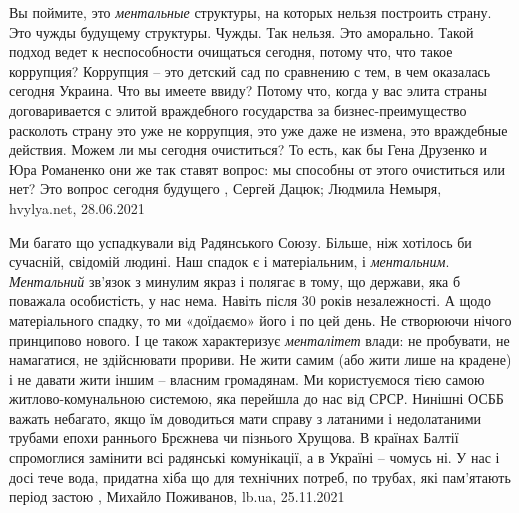Вы поймите, это \emph{ментальные} структуры, на которых нельзя построить страну. Это
чужды будущему структуры. Чужды. Так нельзя. Это аморально. Такой подход ведет
к неспособности очищаться сегодня, потому что, что такое коррупция? Коррупция –
это детский сад по сравнению с тем, в чем оказалась сегодня Украина.  Что вы
имеете ввиду?  Потому что, когда у вас элита страны договаривается с элитой
враждебного государства за бизнес-преимущество расколоть страну это уже не
коррупция, это уже даже не измена, это враждебные действия. Можем ли мы сегодня
очиститься? То есть, как бы Гена Друзенко и Юра Романенко они же так ставят
вопрос: мы способны от этого очиститься или нет? Это вопрос сегодня будущего
, 
Сергей Дацюк; Людмила Немыря, hvylya.net, 28.06.2021

Ми багато що успадкували від Радянського Союзу. Більше, ніж хотілось би
сучасній, свідомій людині. Наш спадок є і матеріальним, і \emph{ментальним}.
\emph{Ментальний} зв'язок з минулим якраз і полягає в тому, що держави, яка б поважала
особистість, у нас нема. Навіть після 30 років незалежності.  А щодо
матеріального спадку, то ми «доїдаємо» його і по цей день. Не створюючи нічого
принципово нового. І це також характеризує \emph{менталітет} влади: не пробувати, не
намагатися, не здійснювати прориви. Не жити самим (або жити лише на крадене) і
не давати жити іншим – власним громадянам.  Ми користуємося тією самою
житлово-комунальною системою, яка перейшла до нас від СРСР. Нинішні ОСББ важать
небагато, якщо їм доводиться мати справу з латаними і недолатаними трубами
епохи раннього Брєжнева чи пізнього Хрущова. В країнах Балтії спромоглися
замінити всі радянські комунікації, а в Україні – чомусь ні. У нас і досі тече
вода, придатна хіба що для технічних потреб, по трубах, які пам’ятають період
застою
, Михайло Поживанов, lb.ua, 25.11.2021

